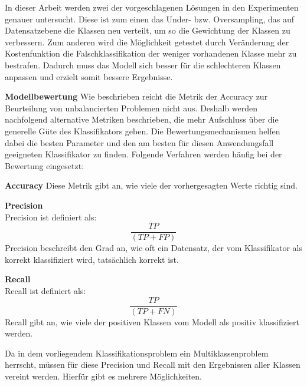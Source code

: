 In dieser Arbeit werden zwei der vorgeschlagenen Lösungen in den Experimenten genauer untersucht. 
Diese ist zum einen das Under- bzw. Oversampling, das auf Datensatzebene die Klassen neu verteilt, um so die Gewichtung der Klassen zu verbessern. 
Zum anderen wird die Möglichkeit getestet durch Veränderung der Kostenfunktion die Falschklassifikation der weniger vorhandenen Klasse mehr zu bestrafen. 
Dadurch muss das Modell sich besser für die schlechteren Klassen anpassen und erzielt somit bessere Ergebnisse. 
\cite{Chapter 2 Foundations on Imbalanced Classification von Fernandez} 


\textbf{Modellbewertung}
Wie beschrieben reicht die Metrik der Accuracy zur Beurteilung von unbalancierten Problemen nicht aus.
Deshalb werden nachfolgend alternative Metriken beschrieben, die mehr Aufschluss über die generelle Güte des Klassifikators geben. 
Die Bewertungsmechanismen helfen dabei die besten Parameter und den am besten für diesen Anwendungsfall geeigneten Klassifikator zu finden.
Folgende Verfahren werden häufig bei der Bewertung eingesetzt:

\textbf{Accuracy}
Diese Metrik gibt an, wie viele der vorhergesagten Werte richtig sind. %


\textbf{Precision} \cite{Fundamentals of ML Kapitel 8.4.2.2} \\
Precision ist definiert als: \\
\begin{equation}
 \frac{TP}{(TP+FP)}
\end{equation}
Precision beschreibt den Grad an, wie oft ein Datensatz, der vom Klassifikator als korrekt klassifiziert wird, tatsächlich korrekt ist. 

\textbf{Recall} \\
Recall ist definiert als: \\
\begin{equation}
 \frac{TP}{(TP+FN)}
\end{equation}
Recall gibt an, wie viele der positiven Klassen vom Modell als positiv klassifiziert werden. 


Da in dem vorliegendem Klassifikationsproblem ein Multiklassenproblem herrscht, müssen für diese Precision und Recall mit den Ergebnissen aller Klassen vereint werden. 
Hierfür gibt es mehrere Möglichkeiten. 



